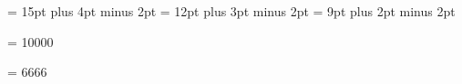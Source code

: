 \chapheadingskip = 15pt plus 4pt minus 2pt
\secheadingskip = 12pt plus 3pt minus 2pt
\subsecheadingskip = 9pt plus 2pt minus 2pt

\vbadness = 10000

\hbadness = 6666


%
\def\setemergencystretch{%
  \ifx\emergencystretch\thisisundefined
    \def\emergencystretch{\dimen0}%
  \else
    \emergencystretch = .15\hsize
  \fi
}

%
%
\def\internalpagesizes#1#2#3#4#5#6#7#8{%
  \voffset = #3\relax
  \topskip = #6\relax
  \splittopskip = \topskip
  \vsize = #1\relax
  \advance\vsize by \topskip
  \txipageheight = \vsize
  \hsize = #2\relax
  \txipagewidth = \hsize
  \normaloffset = #4\relax
  \bindingoffset = #5\relax
  \ifpdf
    \pdfpageheight #7\relax
    \pdfpagewidth #8\relax
    \pdfhorigin = 1 true in
    \pdfvorigin = 1 true in
  \else
    \ifxetex
      \pdfpageheight #7\relax
      \pdfpagewidth #8\relax
    \else
      \special{papersize=#8,#7}%
    \fi
  \fi
  \setleading{\textleading}
  \parindent = \defaultparindent
  \setemergencystretch
}

\def\letterpaper{{\globaldefs = 1
  \parskip = 3pt plus 2pt minus 1pt
  \textleading = 13.2pt
  \internalpagesizes{607.2pt}{6in}%
                    {\voffset}{.25in}%
                    {\bindingoffset}{36pt}%
                    {11in}{8.5in}%
}}

\def\smallbook{{\globaldefs = 1
  \parskip = 2pt plus 1pt
  \textleading = 12pt
  \internalpagesizes{7.5in}{5in}%
                    {-.2in}{0in}%
                    {\bindingoffset}{16pt}%
                    {9.25in}{7in}%
  \lispnarrowing = 0.3in
  \tolerance = 700
  \contentsrightmargin = 0pt
  \defbodyindent = .5cm
}}

